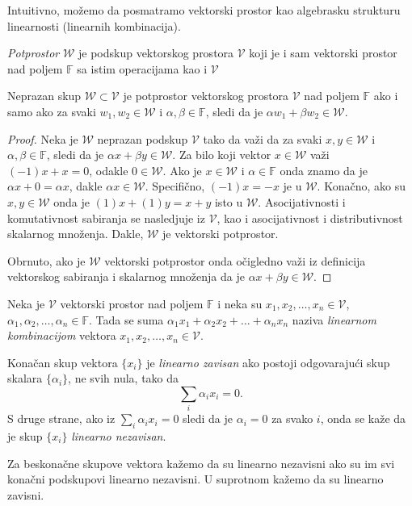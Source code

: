 \documentclass{article}
\begin{document}
Intuitivno, možemo da posmatramo vektorski prostor kao algebrasku strukturu linearnosti (linearnih kombinacija).

\begin{definition}
  \textit{Potprostor} $\mathcal{W}$ je podskup vektorskog prostora $\mathcal{V}$ koji je i sam vektorski prostor nad poljem $\mathbb{F}$ sa istim operacijama kao i $\mathcal{V}$
\end{definition}

\begin{theorem}
  Neprazan skup $\mathcal{W} \subset \mathcal{V}$ je potprostor vektorskog prostora $\mathcal{V}$ nad poljem $\mathbb{F}$ ako i samo ako za svaki $w_1, w_2 \in \mathcal{W}$ i $\alpha, \beta \in \mathbb{F}$, sledi da je $\alpha w_1 + \beta w_2 \in \mathcal{W}$.
\end{theorem}

\begin{proof}
  Neka je $\mathcal{W}$ neprazan podskup $\mathcal{V}$ tako da važi da za svaki $x, y \in \mathcal{W}$ i $\alpha, \beta \in \mathbb{F}$, sledi da je $\alpha x + \beta y \in \mathcal{W}$.
  Za bilo koji vektor $x \in \mathcal{W}$ važi $(-1) x + x = 0$, odakle $0 \in \mathcal{W}$.
  Ako je $x \in \mathcal{W}$ i $\alpha \in \mathbb{F}$ onda znamo da je $\alpha x + 0 = \alpha x$, dakle $\alpha x \in \mathcal{W}$.
  Specifično, $(-1) x = -x$ je u $\mathcal{W}$.
  Konačno, ako su $x, y \in \mathcal{W}$ onda je $(1) x + (1) y = x + y$ isto u $\mathcal{W}$.
  Asocijativnosti i komutativnost sabiranja se nasledjuje iz $\mathcal{V}$, kao i asocijativnost i distributivnost skalarnog množenja.
  Dakle, $\mathcal{W}$ je vektorski potprostor.

  Obrnuto, ako je $\mathcal{W}$ vektorski potprostor onda očigledno važi iz definicija vektorskog sabiranja i skalarnog množenja da je $\alpha x + \beta y \in \mathcal{W}$.
\end{proof}

\begin{definition}
  Neka je $\mathcal{V}$ vektorski prostor nad poljem $\mathbb{F}$ i neka su $x_1, x_2, \ldots, x_n \in \mathcal{V}$, $\alpha_1, \alpha_2, \ldots, \alpha_n \in \mathbb{F}$.
  Tada se suma $\alpha_1 x_1 + \alpha_2 x_2 + \ldots + \alpha_n x_n$ naziva \textit{linearnom kombinacijom} vektora $x_1, x_2, \ldots, x_n \in \mathcal{V}$.
\end{definition}

\begin{definition}
  Konačan skup vektora $\{x_i\}$ je \textit{linearno zavisan} ako postoji odgovarajući skup skalara $\{\alpha_i\}$, ne svih nula, tako da
  \[\sum_{i} \alpha_i x_i = 0.\]
  S druge strane, ako iz $\sum_{i} \alpha_i x_i = 0$ sledi da je $\alpha_i = 0$ za svako $i$, onda se kaže da je skup $\{x_i\}$ \textit{linearno nezavisan}.
  
  Za beskonačne skupove vektora kažemo da su linearno nezavisni ako su im svi konačni podskupovi linearno nezavisni.
  U suprotnom kažemo da su linearno zavisni.
\end{definition}
\end{document}
